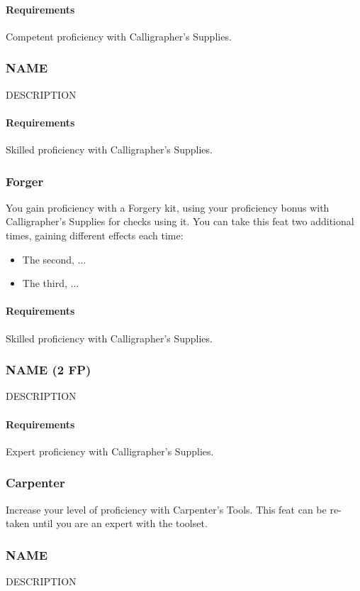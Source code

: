     \paragraph{Requirements} Competent proficiency with Calligrapher's Supplies.
\subsubsection{NAME} \label{feat::name}
    DESCRIPTION
    \paragraph{Requirements} Skilled proficiency with Calligrapher's Supplies.
\subsubsection{Forger} \label{feat::forger}
    You gain proficiency with a Forgery kit, using your proficiency bonus with Calligrapher's Supplies for checks using it.
    You can take this feat two additional times, gaining different effects each time:
    \begin{itemize}
        \item The second, ...
        \item The third, ...
    \end{itemize}
    \paragraph{Requirements} Skilled proficiency with Calligrapher's Supplies.
\subsubsection{NAME (2 FP)} \label{feat::name}
    DESCRIPTION
    \paragraph{Requirements} Expert proficiency with Calligrapher's Supplies.
\subsubsection{Carpenter} \label{feat::carpenter}
    Increase your level of proficiency with Carpenter's Tools.
    This feat can be re-taken until you are an expert with the toolset.
\subsubsection{NAME} \label{feat::name}
    DESCRIPTION
